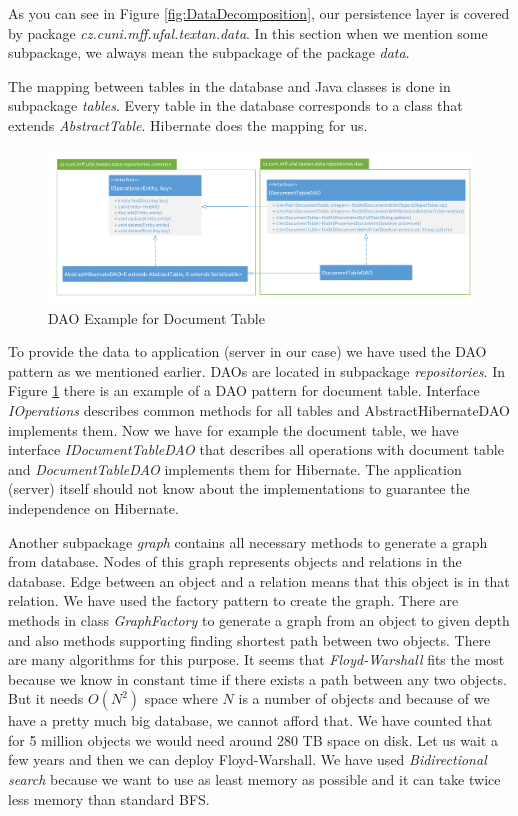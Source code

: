 As you can see in Figure \ref{fig:DataDecomposition}, our persistence layer is
covered by package \emph{cz.\-cuni.\-mff.\-ufal.\-textan.\-data}. In this section when we
mention some subpackage, we always mean the subpackage of the package \emph{data}.

The mapping between tables in the database and Java classes is done in
subpackage \emph{tables}. Every table in the database corresponds to a class
that extends \emph{AbstractTable}. Hibernate does the mapping for us.

\begin{figure}[!htb]
        \centering
        \includegraphics[width=\textwidth]{Images/DatabaseDAO}
        \caption{DAO Example for Document Table}
        \label{fig:DatabaseDAO}
\end{figure}

To provide the data to application (server in our case) we have used the DAO
pattern as we mentioned earlier. DAOs are located in subpackage
\emph{repositories}. In Figure \ref{fig:DatabaseDAO} there is an example of a
DAO pattern for document table. Interface \emph{IOperations} describes common
methods for all tables and AbstractHibernateDAO implements them. Now we have for
example the document table, we have interface \emph{IDocumentTableDAO} that
describes all operations with document table and \emph{DocumentTableDAO}
implements them for Hibernate. The application (server) itself should not know about the implementations to guarantee the independence on Hibernate.

Another subpackage \emph{graph} contains all necessary methods to generate a
graph from database. Nodes of this graph represents objects and relations in
the database. Edge between an object and a relation means that this object is in
that relation. We have used the factory pattern to create the graph. There are
methods in class \emph{GraphFactory} to generate a graph from an object to given
depth and also methods supporting finding shortest path between two objects.
There are many algorithms for this purpose. It seems that \emph{Floyd-Warshall}
fits the most because we know in constant time if there exists a path between
any two objects. But it needs $O(N^2)$ space where $N$ is a number of objects
and because of we have a pretty much big database, we cannot afford that. We
have counted that for 5 million objects we would need around 280 TB space on
disk. Let us wait a few years and then we can deploy Floyd-Warshall. We have
used \emph{Bidirectional search} because we want to use as least memory as
possible and it can take twice less memory than standard BFS.

